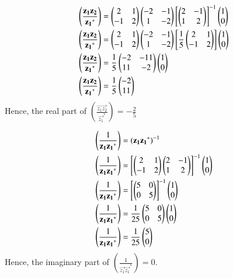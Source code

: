 \begin{align}
&\left(\frac{\mathbf{z_1z_2}}{\mathbf{z_1}^*}\right)=\begin{pmatrix}2 & 1\\ -1 & 2\end{pmatrix}\begin{pmatrix}-2 & -1\\ 1 & -2\end{pmatrix}\left[\begin{pmatrix}2 & -1\\ 1 & 2\end{pmatrix}\right]^{-1}\begin{pmatrix}1 \\0\end{pmatrix}\label{eq:solutions/complex/13eqn_4}\\
&\left(\frac{\mathbf{z_1z_2}}{\mathbf{z_1}^*}\right)=\begin{pmatrix}2 & 1\\ -1 & 2\end{pmatrix}\begin{pmatrix}-2 & -1\\ 1 & -2\end{pmatrix}\left[\frac{1}{5}\begin{pmatrix}2 & 1\\ -1 & 2\end{pmatrix}\right]\begin{pmatrix}1 \\0\end{pmatrix}\label{eq:solutions/complex/13eqn_5}\\
&\left(\frac{\mathbf{z_1z_2}}{\mathbf{z_1}^*}\right)=\frac{1}{5}\begin{pmatrix}-2 & -11\\ 11 & -2\end{pmatrix}\begin{pmatrix}1 \\0\end{pmatrix}\label{eq:solutions/complex/13eqn_6}\\
&\left(\frac{\mathbf{z_1z_2}}{\mathbf{z_1}^*}\right)=\frac{1}{5}\begin{pmatrix}-2 \\11\end{pmatrix}\label{eq:solutions/complex/13eqn_7}
\end{align}
Hence, the real part of $\left(\frac{\vec{z_1z_2}}{\vec{z_1}^*}\right)=-\frac{2}{5}$

\begin{align}
&\left(\frac{1}{\mathbf{z_1}\mathbf{z_1}^*}\right)=(\mathbf{z_1}\mathbf{z_1}^*)^{-1}\label{eq:solutions/complex/13eqn_8}\\
&\left(\frac{1}{\mathbf{z_1}\mathbf{z_1}^*}\right)=\left[\begin{pmatrix}2 & 1\\ -1 & 2\end{pmatrix}\begin{pmatrix}2 & -1\\ 1 & 2\end{pmatrix}\right]^{-1}\begin{pmatrix}1 \\0\end{pmatrix}\label{eq:solutions/complex/13eqn_9}\\
&\left(\frac{1}{\mathbf{z_1}\mathbf{z_1}^*}\right)=\left[\begin{pmatrix}5 & 0\\ 0 & 5\end{pmatrix}\right]^{-1}\begin{pmatrix}1 \\0\end{pmatrix}\label{eq:solutions/complex/13eqn_10}\\
&\left(\frac{1}{\mathbf{z_1}\mathbf{z_1}^*}\right)=\frac{1}{25}\begin{pmatrix}5 & 0\\ 0 & 5\end{pmatrix}\begin{pmatrix}1 \\0\end{pmatrix}\label{eq:solutions/complex/13eqn_11}\\
&\left(\frac{1}{\mathbf{z_1}\mathbf{z_1}^*}\right)=\frac{1}{25}\begin{pmatrix}5 \\ 0\end{pmatrix}\label{eq:solutions/complex/13eqn_12}
\end{align}
Hence, the imaginary part of $\left(\frac{1}{\vec{z_1}\vec{z_1}^*}\right)=0$.
